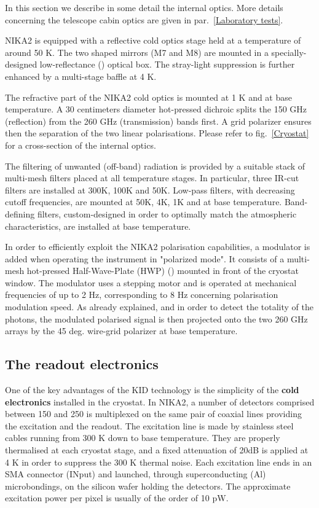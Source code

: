 \documentclass[]{aa} %
\begin{document}
In this section we describe in some detail the internal optics. More details concerning the telescope cabin optics are given in par.~\ref{Laboratory tests}.

NIKA2 is equipped with a reflective cold optics stage held at a temperature of around 50 K. The two shaped mirrors (M7 and M8) are mounted in a specially-designed low-reflectance (\cite{Calvo2010}) optical box. The stray-light suppression is further enhanced by a multi-stage baffle at 4 K.

The refractive part of the NIKA2 cold optics is mounted at 1 K and at base temperature. A 30 centimeters diameter hot-pressed dichroic splits the 150 GHz (reflection) from the 260 GHz (transmission) bands first. A grid polarizer ensures then the separation of the two linear polarisations.  Please refer to fig.~\ref{Cryostat} for a cross-section of the internal optics.
 

The filtering of unwanted (off-band) radiation is provided by a suitable stack of multi-mesh filters placed at all temperature stages. In particular, three IR-cut filters are installed at 300K, 100K and 50K. Low-pass filters, with decreasing cutoff frequencies, are mounted at 50K, 4K, 1K and at base temperature. Band-defining filters, custom-designed in order to optimally match the atmospheric characteristics, are installed at base temperature. 

In order to efficiently exploit the NIKA2 polarisation capabilities, a modulator is added when operating the instrument in "polarized mode". It consists of a multi-mesh hot-pressed Half-Wave-Plate (HWP) (\cite{Pisano2016}) mounted in front of the cryostat window. The modulator uses a stepping motor and is operated at mechanical frequencies of up to 2 Hz, corresponding to 8 Hz concerning polarisation modulation speed. As already explained, and in order to detect the totality of the photons, the modulated polarised signal is then projected onto the two 260 GHz arrays by the 45 deg. wire-grid polarizer at base temperature.  


 \subsection{The readout electronics}

One of the key advantages of the KID technology is the simplicity of the {\bf{cold electronics}} installed in the cryostat. In NIKA2, a number of detectors comprised between 150 and 250 is multiplexed on the same pair of coaxial lines providing the excitation and the readout. The excitation line is made by stainless steel cables running from 300 K down to base temperature. They are properly thermalised at each cryostat stage, and a fixed attenuation of 20dB is applied at 4 K in order to suppress the 300 K thermal noise. Each excitation line ends in an SMA connector (INput) and launched, through superconducting (Al) microbondings, on the silicon wafer holding the detectors. The approximate excitation power per pixel is usually of the order of 10 pW.
\end{document}
